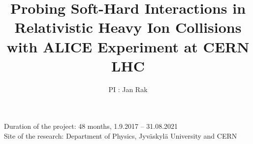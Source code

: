 \documentclass[12pt]{article}
\title{Probing Soft-Hard Interactions in Relativistic Heavy Ion Collisions with ALICE Experiment at CERN LHC}
\author{PI : Jan Rak}
\begin{document}
\maketitle
\begin{flushleft}
Duration of the project: 48 months, 1.9.2017 -- 31.08.2021\\
Site of the research: Department of Physics, Jyv\"askyl\"a University and CERN
\end{flushleft}





%


\end{document}
